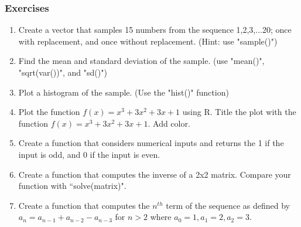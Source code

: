 \documentclass{beamer}
\begin{document}
\begin{frame}\frametitle{Exercises}
	\begin{enumerate}
		\item Create a vector that samples 15 numbers from the sequence 1,2,3,...20; once with replacement, and once without replacement. (Hint: use "sample()")
		\item Find the mean and standard deviation of the sample. (use "mean()",  "sqrt(var())", and "sd()")
		\item Plot a histogram of the sample. (Use the "hist()" function)
		\item Plot the function $f(x)=x^3+3x^2+3x+1$ using R. Title the plot with the function $f(x)=x^3+3x^2+3x+1$. Add color. 
		\item Create a function that considers numerical inputs and returns the 1 if the input is odd, and 0 if the input is even. 
		\item Create a function that computes the inverse of a 2x2 matrix. Compare your function with ``solve(matrix)".
		\item Create a function that computes the $n^{th}$ term of the sequence as defined by $a_n=a_{n-1}+a_{n-2}-a_{n-3}$ for $n>2$ where $a_0=1, a_1=2,a_2=3$.
	\end{enumerate}
\end{frame}
\end{document}
